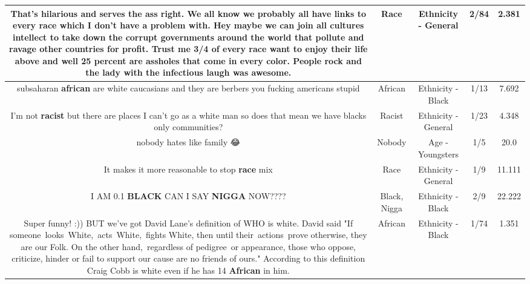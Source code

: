 \documentclass[11pt]{article}
\newlength\mylength
\begin{document}
\begin{center}
\begin{longtable}{|C{.65\mylength}|C{.30\mylength}|C{.12\mylength}|C{.12\mylength}|C{.12\mylength}|}
  \small That's hilarious and serves the ass right.  We all know we probably all have links to every \textbf{race} which I don't have a problem with.  Hey maybe we can join all cultures intellect to take down the corrupt governments around the world that pollute and ravage other countries for profit.  Trust me 3/4 of every \textbf{race} want to enjoy their life above and well 25 percent are assholes that come in every color.  People rock and the lady with the infectious laugh was awesome.\normalsize   & Race & Ethnicity - General & 2/84 & 2.381 \\  \hline
  \small subsaharan \textbf{african} are white caucasians and they are berbers you fucking americans stupid\normalsize   & African & Ethnicity - Black & 1/13 & 7.692 \\  \hline
  \small I'm not \textbf{racist} but there are places I can't go as a white man so does that mean we have blacks only communities?\normalsize   & Racist & Ethnicity - General & 1/23 & 4.348 \\  \hline
  \small nobody hates like family 😂\normalsize   & Nobody & Age - Youngsters & 1/5 & 20.0 \\  \hline
  \small It makes it more reasonable  to stop \textbf{race} mix\normalsize   & Race & Ethnicity - General & 1/9 & 11.111 \\  \hline
  \small I AM 0.1 \textbf{BLACK} CAN I SAY \textbf{NIGGA} NOW????\normalsize   & Black, Nigga & Ethnicity - Black & 2/9 & 22.222 \\  \hline
  \small Super funny! :)) BUT we've got David Lane's definition of WHO is white. David said "If someone looks White, acts White, fights White, then until their actions prove otherwise, they are our Folk. On the other hand, regardless of pedigree or appearance, those who oppose, criticize, hinder or fail to support our cause are no friends of ours." According to this definition Craig Cobb is white even if he has 14 \textbf{African} in him.\normalsize   & African & Ethnicity - Black & 1/74 & 1.351 \\  \hline

\end{longtable}
\end{center}
\end{document}
